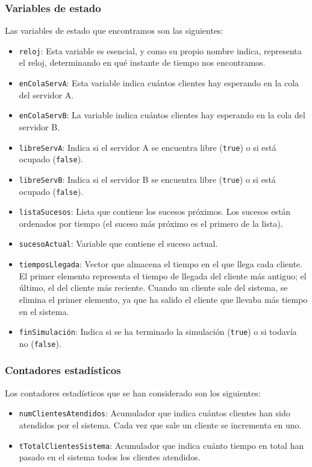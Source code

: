 \documentclass[11pt,a4paper]{article}
\begin{document}
\subsubsection{Variables de estado}

Las variables de estado que encontramos son las siguientes:

\begin{itemize}[label=\textbullet]
	\item \texttt{reloj}: Esta variable es esencial, y como su propio nombre indica, representa
	el reloj, determinando en qué instante de tiempo nos encontramos.
	\item \texttt{enColaServA}: Esta variable indica cuántos clientes hay esperando en la
	cola del servidor A.
	\item \texttt{enColaServB}: La variable indica cuántos clientes hay esperando en la
	cola del servidor B.
	\item \texttt{libreServA}: Indica si el servidor A se encuentra libre (\texttt{true}) o si
	está ocupado (\texttt{false}).
	\item \texttt{libreServB}: Indica si el servidor B se encuentra libre (\texttt{true}) o si
	está ocupado (\texttt{false}).
	\item \texttt{listaSucesos}: Lista que contiene los sucesos próximos. Los sucesos están ordenados
	por tiempo (el suceso más próximo es el primero de la lista).
	\item \texttt{sucesoActual}: Variable que contiene el suceso actual.
	\item \texttt{tiemposLlegada}: Vector que almacena el tiempo en el que llega cada cliente.
	El primer elemento representa el tiempo de llegada del cliente más antiguo; el último, el del
	cliente más reciente. Cuando un cliente sale del sistema, se elimina el primer elemento, ya que
	ha salido el cliente que llevaba más tiempo en el sistema.
	\item \texttt{finSimulación}: Indica si se ha terminado la simulación (\texttt{true}) o si todavía
	no (\texttt{false}).
\end{itemize}

\subsubsection{Contadores estadísticos}

Los contadores estadísticos que se han considerado son los siguientes:

\begin{itemize}[label=\textbullet]
	\item \texttt{numClientesAtendidos}: Acumulador que indica cuántos clientes han sido atendidos
	por el sistema. Cada vez que sale un cliente se incrementa en uno.
	\item \texttt{tTotalClientesSistema}: Acumulador que indica cuánto tiempo en total han pasado
	en el sistema todos los clientes atendidos.
\end{itemize}
\end{document}
